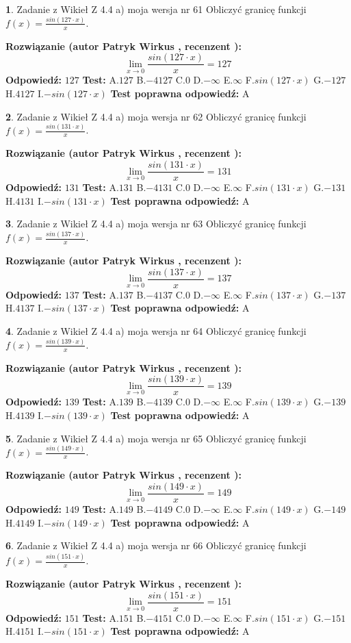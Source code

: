 \documentclass[12pt, a4paper]{article}
\theoremstyle{definition} %
\newtheorem{zad}{}
\newcommand{\zadStart}[1]{\begin{zad}#1\newline}
\newcommand{\zadStop}{\end{zad}}
\newcommand{\rozwStart}[2]{\noindent \textbf{Rozwiązanie (autor #1 , recenzent #2): }\newline}
\newcommand{\rozwStop}{\newline}
\newcommand{\odpStart}{\noindent \textbf{Odpowiedź:}\newline}
\newcommand{\odpStop}{\newline}
\newcommand{\testStart}{\noindent \textbf{Test:}\newline}
\newcommand{\testStop}{\newline}
\newcommand{\kluczStart}{\noindent \textbf{Test poprawna odpowiedź:}\newline}
\newcommand{\kluczStop}{\newline}
\begin{document}
\zadStart{Zadanie z Wikieł Z 4.4 a) moja wersja nr 61}
Obliczyć granicę funkcji $f(x)=\frac{sin(127\cdot x)}{x}$.
\zadStop
\rozwStart{Patryk Wirkus}{}
$$\lim\limits_{x\to 0}\frac{sin(127\cdot x)}{x}=
127$$
\rozwStop
\odpStart
$127$
\odpStop
\testStart
A.$127$
B.$-4127$
C.$0$
D.$-\infty$
E.$\infty$
F.$sin(127\cdot x)$
G.$-127$
H.$4127$
I.$-sin(127\cdot x)$
\testStop
\kluczStart
A
\kluczStop



\zadStart{Zadanie z Wikieł Z 4.4 a) moja wersja nr 62}
Obliczyć granicę funkcji $f(x)=\frac{sin(131\cdot x)}{x}$.
\zadStop
\rozwStart{Patryk Wirkus}{}
$$\lim\limits_{x\to 0}\frac{sin(131\cdot x)}{x}=
131$$
\rozwStop
\odpStart
$131$
\odpStop
\testStart
A.$131$
B.$-4131$
C.$0$
D.$-\infty$
E.$\infty$
F.$sin(131\cdot x)$
G.$-131$
H.$4131$
I.$-sin(131\cdot x)$
\testStop
\kluczStart
A
\kluczStop



\zadStart{Zadanie z Wikieł Z 4.4 a) moja wersja nr 63}
Obliczyć granicę funkcji $f(x)=\frac{sin(137\cdot x)}{x}$.
\zadStop
\rozwStart{Patryk Wirkus}{}
$$\lim\limits_{x\to 0}\frac{sin(137\cdot x)}{x}=
137$$
\rozwStop
\odpStart
$137$
\odpStop
\testStart
A.$137$
B.$-4137$
C.$0$
D.$-\infty$
E.$\infty$
F.$sin(137\cdot x)$
G.$-137$
H.$4137$
I.$-sin(137\cdot x)$
\testStop
\kluczStart
A
\kluczStop



\zadStart{Zadanie z Wikieł Z 4.4 a) moja wersja nr 64}
Obliczyć granicę funkcji $f(x)=\frac{sin(139\cdot x)}{x}$.
\zadStop
\rozwStart{Patryk Wirkus}{}
$$\lim\limits_{x\to 0}\frac{sin(139\cdot x)}{x}=
139$$
\rozwStop
\odpStart
$139$
\odpStop
\testStart
A.$139$
B.$-4139$
C.$0$
D.$-\infty$
E.$\infty$
F.$sin(139\cdot x)$
G.$-139$
H.$4139$
I.$-sin(139\cdot x)$
\testStop
\kluczStart
A
\kluczStop



\zadStart{Zadanie z Wikieł Z 4.4 a) moja wersja nr 65}
Obliczyć granicę funkcji $f(x)=\frac{sin(149\cdot x)}{x}$.
\zadStop
\rozwStart{Patryk Wirkus}{}
$$\lim\limits_{x\to 0}\frac{sin(149\cdot x)}{x}=
149$$
\rozwStop
\odpStart
$149$
\odpStop
\testStart
A.$149$
B.$-4149$
C.$0$
D.$-\infty$
E.$\infty$
F.$sin(149\cdot x)$
G.$-149$
H.$4149$
I.$-sin(149\cdot x)$
\testStop
\kluczStart
A
\kluczStop



\zadStart{Zadanie z Wikieł Z 4.4 a) moja wersja nr 66}
Obliczyć granicę funkcji $f(x)=\frac{sin(151\cdot x)}{x}$.
\zadStop
\rozwStart{Patryk Wirkus}{}
$$\lim\limits_{x\to 0}\frac{sin(151\cdot x)}{x}=
151$$
\rozwStop
\odpStart
$151$
\odpStop
\testStart
A.$151$
B.$-4151$
C.$0$
D.$-\infty$
E.$\infty$
F.$sin(151\cdot x)$
G.$-151$
H.$4151$
I.$-sin(151\cdot x)$
\testStop
\kluczStart
A
\kluczStop
\end{document}
